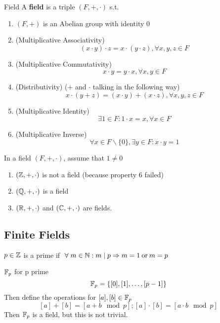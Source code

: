 \begin{definition} {Field}
    A \textbf{field} is a triple \((F, +, \cdot)\) s.t.
    \begin{enumerate}
        \item \((F, +)\) is an Abelian group with identity 0
        \item (Multiplicative Associativity) \[
                  (x \cdot y) \cdot z = x \cdot (y \cdot z), \forall x, y, z \in F
              \]
        \item (Multiplicative Commutativity) \[
                  x \cdot y = y \cdot x, \forall x, y \in F
              \]
        \item (Distributivity) (\(+\) and \(\cdot\) talking in the following way) \[
                  x \cdot (y + z) = (x \cdot y) + (x \cdot z), \forall x, y, z \in F
              \]
        \item (Multiplicative Identity) \[\exists 1 \in F: 1 \cdot x = x, \forall x \in F\]
        \item (Multiplicative Inverse) \[\forall x \in F\backslash\{0\}, \exists y \in F: x \cdot y = 1\]
    \end{enumerate}
\end{definition}
\begin{remark}
    In a field \((F, +, \cdot)\), assume that \(1\neq 0\)
\end{remark}
\begin{example}
    \begin{enumerate}
        \item \((\mathbb{Z}, +, \cdot)\) is not a field (because property 6 failed)
        \item  \((\mathbb{Q}, +, \cdot)\) is a field
        \item \((\mathbb{R}, +, \cdot)\) and \((\mathbb{C}, +, \cdot)\) are fields.
    \end{enumerate}
\end{example}

\subsection{Finite Fields}
\begin{recall}
    \(p\in \mathbb{Z}\) is a prime if \(\forall m\in \bbn: m \mid p \implies m = 1 \:\text{or}\:  m = p\)
\end{recall}
\begin{definition} {\(\mathbb{F}_p\) for p prime}
    \[
        \mathbb{F}_p = \{[0], [1], \dots, [p-1]\}
    \]
    Then define the operations for \([a], [b] \in \mathbb{F}_p\)
    \[
        [a] + [b] = [a + b \mod p]; [a] \cdot [b] = [a \cdot b \mod p]
    \]
    Then \(\mathbb{F}_p\) is a field, but this is not trivial.
\end{definition}

